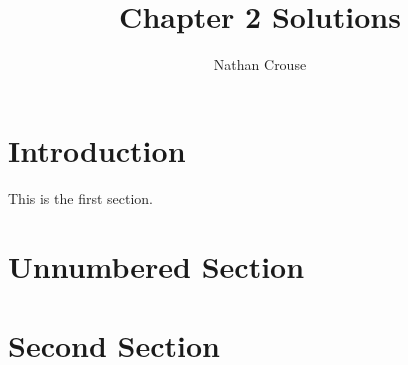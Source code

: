 \documentclass{article}
\title{Chapter 2 Solutions}
\author{Nathan Crouse}
\newcommand*{\solfolder}{C:/Users/nbclsc/Desktop/applied-multivariate-statistics/solutions/chapter-2/}
\begin{document}
    \maketitle





\tableofcontents

\section{Introduction}

This is the first section.

\blindtext

\section*{Unnumbered Section}



\blindtext

\section{Second Section}

\blindtext
\end{document}

